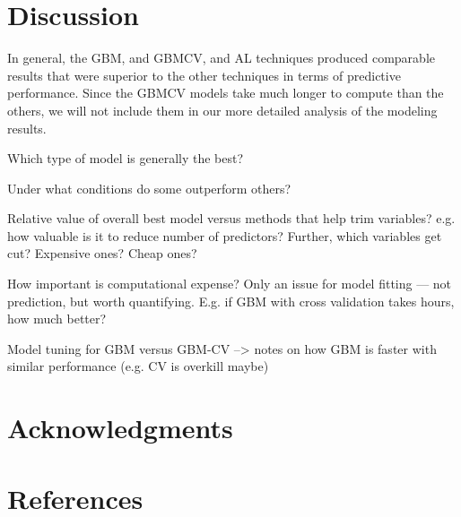\documentclass{article}\usepackage[]{graphicx}\usepackage[]{color}
\numberwithin{equation}{section}
\numberwithin{figure}{section}
\renewcommand\[{\begin{equation}}
\renewcommand\]{\end{equation}}
\begin{document}
\section{Discussion}

In general, the GBM, and GBMCV, and AL techniques produced comparable
results that were superior to the other techniques in terms of predictive
performance. Since the GBMCV models take much longer to compute than
the others, we will not include them in our more detailed analysis
of the modeling results.

Which type of model is generally the best?

Under what conditions do some outperform others?

Relative value of overall best model versus methods that help trim
variables? e.g. how valuable is it to reduce number of predictors?
Further, which variables get cut? Expensive ones? Cheap ones?

How important is computational expense? Only an issue for model fitting
--- not prediction, but worth quantifying. E.g. if GBM with cross
validation takes hours, how much better? 

Model tuning for GBM versus GBM-CV --> notes on how GBM is faster
with similar performance (e.g. CV is overkill maybe)


\section{Acknowledgments}


\section{References}


\end{document}
